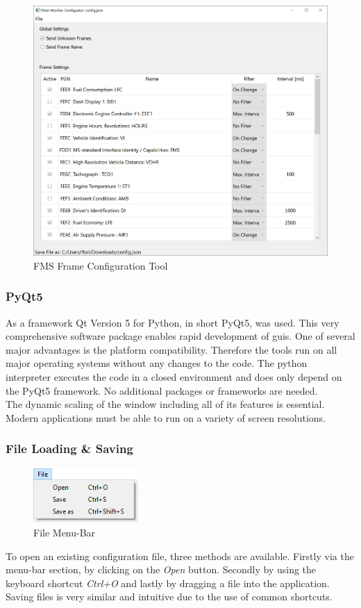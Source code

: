 \medskip
\begin{figure}[h!]
	\centering
	\includegraphics[width=\textwidth]{images/Configuration-Tool_Screenshot}
	\caption{FMS Frame Configuration Tool}
	\label{fig:configuration_tool}
\end{figure}
\newpage

\subsubsection{PyQt5}
As a framework Qt Version 5 for Python, in short PyQt5, was used. This very comprehensive software package enables rapid development of \acrshort{gui}s. One of several major advantages is the platform compatibility. Therefore the tools run on all major operating systems without any changes to the code. The python interpreter executes the code in a closed environment and does only depend on the PyQt5 framework. No additional packages or frameworks are needed. \\
The dynamic scaling of the window including all of its features is essential. Modern applications must be able to run on a variety of screen resolutions.

\subsubsection{File Loading \& Saving}
\begin{figure}
\vspace{-0.6cm}
\includegraphics[width=4.0cm]{images/configuration-tool-file-panel}
\caption{File Menu-Bar}
\end{figure} 
To open an existing configuration file, three methods are available. Firstly via the menu-bar section, by clicking on the \textit{Open} button. Secondly by using the keyboard shortcut \textit{Ctrl+O} and lastly by dragging a file into the application. Saving files is very similar and intuitive due to the use of common shortcuts.

